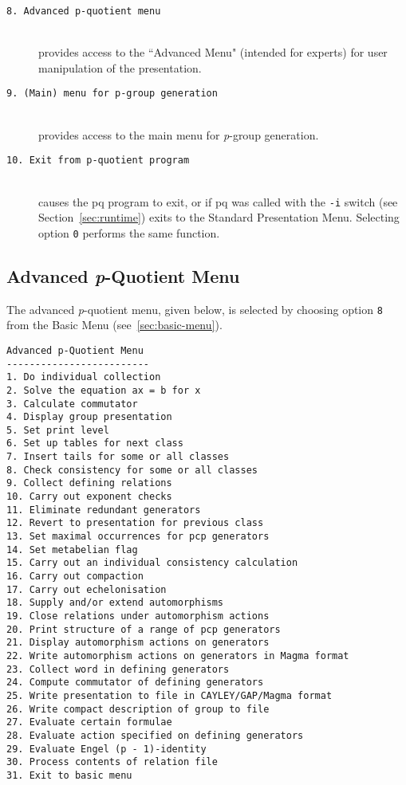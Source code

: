 \documentclass[12pt]{article}
\begin{document}
\begin{description}
\item[\texttt{8.\ Advanced p-quotient menu}]\ \\
 provides access to the ``Advanced Menu" (intended for experts)
 for user manipulation of the presentation.

\item[\texttt{9.\ (Main) menu for p-group generation}]\ \\
 provides access to the main menu for {\it p}-group generation.

\item[\texttt{10.\ Exit from p-quotient program}]\ \\
 causes the pq program to exit, or if pq was called with the \texttt{-i}
 switch (see Section~\ref{sec:runtime}) exits to the Standard Presentation
 Menu. Selecting option \texttt{0} performs the same function.

\end{description}

\subsection{Advanced {\it p}-Quotient Menu}\label{sec:advanced-pq-menu}
The advanced {\it p}-quotient menu, given below, is selected by 
choosing option \texttt{8} from the Basic Menu (see~\ref{sec:basic-menu}).

\begin{verbatim}
Advanced p-Quotient Menu
-------------------------
1. Do individual collection
2. Solve the equation ax = b for x
3. Calculate commutator
4. Display group presentation
5. Set print level
6. Set up tables for next class
7. Insert tails for some or all classes
8. Check consistency for some or all classes
9. Collect defining relations
10. Carry out exponent checks
11. Eliminate redundant generators
12. Revert to presentation for previous class
13. Set maximal occurrences for pcp generators
14. Set metabelian flag
15. Carry out an individual consistency calculation
16. Carry out compaction
17. Carry out echelonisation
18. Supply and/or extend automorphisms
19. Close relations under automorphism actions
20. Print structure of a range of pcp generators
21. Display automorphism actions on generators
22. Write automorphism actions on generators in Magma format
23. Collect word in defining generators
24. Compute commutator of defining generators
25. Write presentation to file in CAYLEY/GAP/Magma format
26. Write compact description of group to file
27. Evaluate certain formulae
28. Evaluate action specified on defining generators
29. Evaluate Engel (p - 1)-identity
30. Process contents of relation file
31. Exit to basic menu
\end{verbatim}
\end{document}

